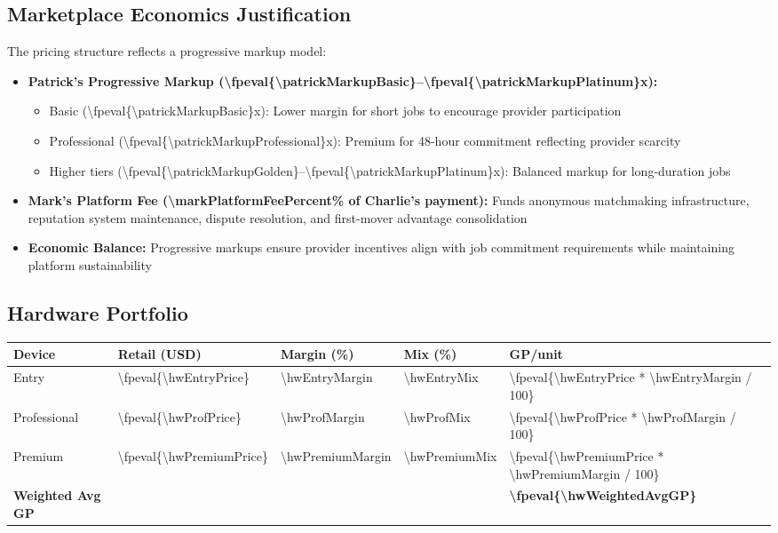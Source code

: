 \documentclass[11pt]{article}
\newcommand{\numfpeval}[1]{\num{\fpeval{#1}}}
\newcommand{\numint}[1]{\num[round-precision=0]{\fpeval{#1}}}
\begin{document}
\subsection{Marketplace Economics Justification}
The pricing structure reflects a progressive markup model:
\begin{itemize}
  \item \textbf{Patrick's Progressive Markup (\numfpeval{\patrickMarkupBasic}--\numfpeval{\patrickMarkupPlatinum}x):} 
  \begin{itemize}
    \item Basic (\numfpeval{\patrickMarkupBasic}x): Lower margin for short jobs to encourage provider participation
    \item Professional (\numfpeval{\patrickMarkupProfessional}x): Premium for 48-hour commitment reflecting provider scarcity
    \item Higher tiers (\numfpeval{\patrickMarkupGolden}--\numfpeval{\patrickMarkupPlatinum}x): Balanced markup for long-duration jobs
  \end{itemize}
  \item \textbf{Mark's Platform Fee (\num{\markPlatformFeePercent}\% of Charlie's payment):} Funds anonymous matchmaking infrastructure, reputation system maintenance, dispute resolution, and first-mover advantage consolidation
  \item \textbf{Economic Balance:} Progressive markups ensure provider incentives align with job commitment requirements while maintaining platform sustainability
\end{itemize}

\subsection{Hardware Portfolio}
\begin{table}[H]
\centering
\begin{tabularx}{\linewidth}{l Y Y Y Y}
\toprule
Device & Retail (USD) & Margin (\%)\cite{industrybenchmark2024} & Mix (\%) & GP/unit \\\midrule
Entry        & \numint{\hwEntryPrice}  & \num{\hwEntryMargin} & \num{\hwEntryMix} & \numint{\hwEntryPrice * \hwEntryMargin / 100} \\
Professional & \numint{\hwProfPrice} & \num{\hwProfMargin} & \num{\hwProfMix} & \numint{\hwProfPrice * \hwProfMargin / 100} \\
Premium      & \numint{\hwPremiumPrice} & \num{\hwPremiumMargin} & \num{\hwPremiumMix} & \numint{\hwPremiumPrice * \hwPremiumMargin / 100} \\\midrule
\textbf{Weighted Avg GP} &  &  &  & \textbf{\numint{\hwWeightedAvgGP}} \\
\bottomrule
\end{tabularx}
\end{table}
\end{document}
